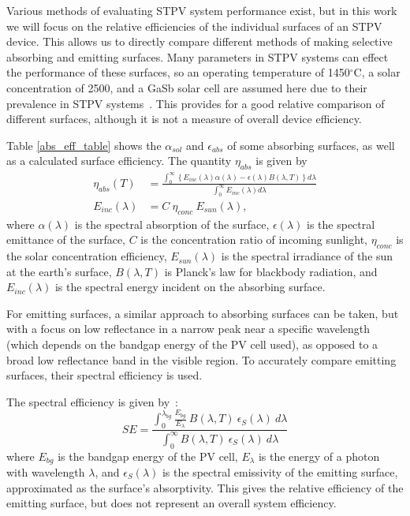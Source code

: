 \documentclass[review]{elsarticle}
\begin{document}
Various methods of evaluating STPV system performance exist, but in this work we will focus on the relative efficiencies of the individual surfaces of an STPV device.  This allows us to directly compare different methods of making selective absorbing and emitting surfaces.  Many parameters in STPV systems can effect the performance of these surfaces, so an operating temperature of 1450$^\circ$C, a solar concentration of 2500, and a GaSb solar cell are assumed here due to their prevalence in STPV systems~\cite{exp_tokyo,exp_madrid,exp_russia,me1,me2,RF_OptExp_2009}.  This provides for a good relative comparison of different surfaces, although it is not a measure of overall device efficiency.

Table \ref{abs_eff_table} shows the $\alpha_{sol}$ and $\epsilon_{abs}$ of some absorbing surfaces, as well as a calculated surface efficiency.  The quantity $\eta_{abs}$ is given by
\begin{align}
\label{overall_sss_eq}\eta_{abs}(T)& = \frac{\int_{0}^{\infty}\left\{E_{inc}(\lambda)\alpha(\lambda)-\epsilon(\lambda)B(\lambda,T)\right\}d\lambda}{\int_{0}^{\infty}E_{inc}(\lambda)d\lambda}\\
\label{e_incident}E_{inc}(\lambda) &= C \: \eta_{conc} \: E_{sun}(\lambda),
\end{align}
where $\alpha(\lambda)$ is the spectral absorption of the surface, $\epsilon(\lambda)$ is the spectral emittance of the surface, $C$ is the concentration ratio of incoming sunlight, 
$\eta_{conc}$ is the solar concentration efficiency, $E_{sun}(\lambda)$ is the 
spectral irradiance of the sun at the earth's surface, $B(\lambda, T)$ is 
Planck's law for blackbody radiation, and $E_{inc}(\lambda)$ is the spectral 
energy incident on the absorbing surface.

For emitting surfaces, a similar approach to absorbing surfaces can be taken, but with a focus on low reflectance in a narrow peak near a specific wavelength (which depends on the bandgap energy of the PV cell used), as opposed to a broad low reflectance band in the visible region.  To accurately compare emitting surfaces, their spectral efficiency is used.

The spectral efficiency is given by~\cite{me2}:
\begin{equation}\label{SpecEff}
SE = \frac{  \int_0^{\lambda_{bg}} \frac{ E_{bg} }{E_{\lambda}} \: B(\lambda, T) \: \epsilon_S (\lambda) \: d\lambda }
{\int_0^{\infty} B(\lambda,T) \: \epsilon_S (\lambda) \: d\lambda}
\end{equation}
where $E_{bg}$ is the bandgap energy of the PV cell, $E_{\lambda}$ is the energy of a photon with wavelength $\lambda$, and $\epsilon_S (\lambda)$ is the spectral emissivity of the emitting surface, approximated as the surface's absorptivity.  This gives the relative efficiency of the emitting surface, but does not represent an overall system efficiency.
\end{document}

